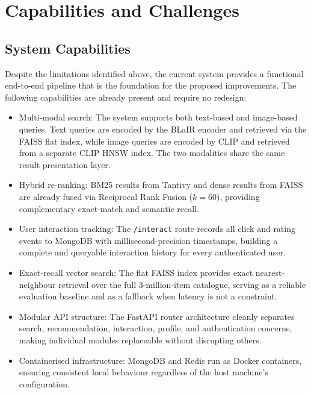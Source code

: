 \section{Capabilities and Challenges}
\label{sec:capabilities_challenges}

\subsection{System Capabilities}

Despite the limitations identified above, the current system provides a functional end-to-end pipeline that is the foundation for the proposed improvements.
The following capabilities are already present and require no redesign:

\begin{itemize}
    \item Multi-modal search: The system supports both text-based and image-based queries.
    Text queries are encoded by the BLaIR encoder and retrieved via the FAISS flat index, while image queries are encoded by CLIP and retrieved from a separate CLIP HNSW index.
    The two modalities share the same result presentation layer.

    \item Hybrid re-ranking: BM25 results from Tantivy and dense results from FAISS are already fused via Reciprocal Rank Fusion ($k = 60$), providing complementary exact-match and semantic recall.

    \item User interaction tracking: The \texttt{/interact} route records all click and rating events to MongoDB with millisecond-precision timestamps, building a complete and queryable interaction history for every authenticated user.

    \item Exact-recall vector search: The flat FAISS index provides exact nearest-neighbour retrieval over the full 3-million-item catalogue, serving as a reliable evaluation baseline and as a fallback when latency is not a constraint.

    \item Modular API structure: The FastAPI router architecture cleanly separates search, recommendation, interaction, profile, and authentication concerns, making individual modules replaceable without disrupting others.

    \item Containerised infrastructure: MongoDB and Redis run as Docker containers, ensuring consistent local behaviour regardless of the host machine's configuration.
\end{itemize}

